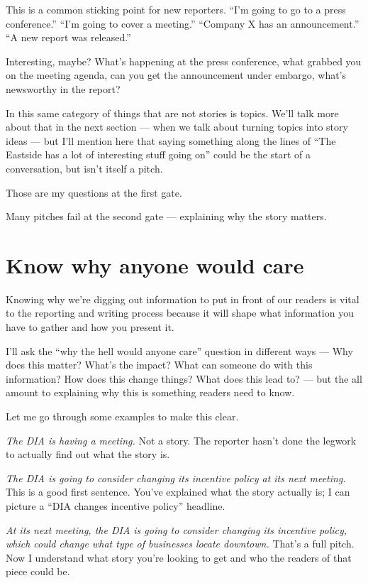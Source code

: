 \documentclass[
  11pt,
  american,
  letterpaperpaper,
  extrafontsizes,onecolumn,openright
  ]{memoir}
\begin{document}
This is a common sticking point for new reporters. \enquote{I'm going to go to a press conference.} \enquote{I'm going to cover a meeting.} \enquote{Company X has an announcement.} \enquote{A new report was released.}

Interesting, maybe? What's happening at the press conference, what grabbed you on the meeting agenda, can you get the announcement under embargo, what's newsworthy in the report?

In this same category of things that are not stories is topics. We'll talk more about that in the next section --- when we talk about turning topics into story ideas --- but I'll mention here that saying something along the lines of \enquote{The Eastside has a lot of interesting stuff going on} could be the start of a conversation, but isn't itself a pitch.

Those are my questions at the first gate.

Many pitches fail at the second gate --- explaining why the story matters.

\hypertarget{know-why-anyone-would-care}{%
\section*{Know why anyone would care}\label{know-why-anyone-would-care}}

Knowing why we're digging out information to put in front of our readers is vital to the reporting and writing process because it will shape what information you have to gather and how you present it.

I'll ask the \enquote{why the hell would anyone care} question in different ways --- Why does this matter? What's the impact? What can someone do with this information? How does this change things? What does this lead to? --- but the all amount to explaining why this is something readers need to know.

Let me go through some examples to make this clear.

\emph{The DIA is having a meeting.} Not a story. The reporter hasn't done the legwork to actually find out what the story is.

\emph{The DIA is going to consider changing its incentive policy at its next meeting.} This is a good first sentence. You've explained what the story actually is; I can picture a \enquote{DIA changes incentive policy} headline.

\emph{At its next meeting, the DIA is going to consider changing its incentive policy, which could change what type of businesses locate downtown.} That's a full pitch. Now I understand what story you're looking to get and who the readers of that piece could be.
\end{document}
